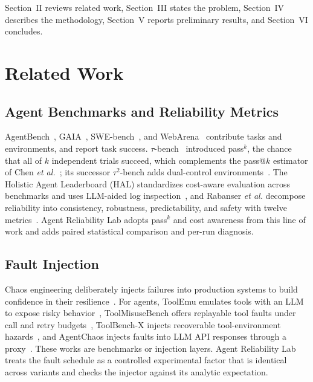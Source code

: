\documentclass[conference,a4paper]{IEEEtran}
\begin{document}
Section~II reviews related work, Section~III states the problem, Section~IV describes
the methodology, Section~V reports preliminary results, and Section~VI concludes.

\section{Related Work}

\subsection{Agent Benchmarks and Reliability Metrics}
AgentBench~\cite{liu2024agentbench}, GAIA~\cite{mialon2024gaia},
SWE-bench~\cite{jimenez2024swebench}, and WebArena~\cite{zhou2024webarena} contribute
tasks and environments, and report task success. $\tau$-bench~\cite{yao2024taubench}
introduced pass$^k$, the chance that all of $k$ independent trials succeed, which
complements the pass@$k$ estimator of Chen \textit{et al.}~\cite{chen2021codex}; its
successor $\tau^2$-bench adds dual-control
environments~\cite{barres2025tau2}. The Holistic Agent Leaderboard (HAL) standardizes
cost-aware evaluation across benchmarks and uses LLM-aided log
inspection~\cite{kapoor2026hal}, and Rabanser \textit{et al.} decompose reliability
into consistency, robustness, predictability, and safety with twelve
metrics~\cite{rabanser2026reliability}. Agent Reliability Lab adopts pass$^k$ and cost
awareness from this line of work and adds paired statistical comparison and per-run
diagnosis.

\subsection{Fault Injection}
Chaos engineering deliberately injects failures into production systems to build
confidence in their resilience~\cite{basiri2016chaos}. For agents,
ToolEmu emulates tools with an LLM to expose risky behavior~\cite{ruan2024toolemu},
ToolMisuseBench offers replayable tool faults under call and retry
budgets~\cite{toolmisusebench2026}, ToolBench-X injects recoverable tool-environment
hazards~\cite{toolbenchx2026}, and AgentChaos injects faults into LLM API responses
through a proxy~\cite{agentchaos2026}. These works are benchmarks or injection layers.
Agent Reliability Lab treats the fault schedule as a controlled experimental factor that
is identical across variants and checks the injector against its analytic expectation.
\end{document}

